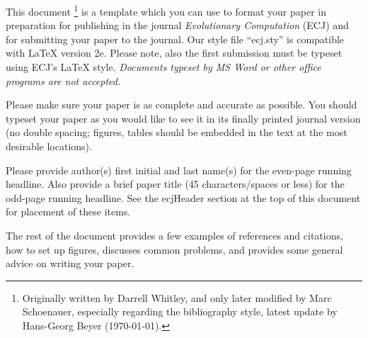 \documentclass[twoside]{article}
\begin{document}
This document%
\footnote{Originally written by Darrell Whitley, and only later
  modified by Marc Schoenauer, especially regarding the bibliography style,
  latest update by Hans-Georg Beyer (\today).} 
is a template which you can use to format your paper in 
preparation for publishing in the journal {\em Evolutionary Computation} 
(ECJ) and for submitting your paper to the journal. Our style file 
``ecj.sty'' is compatible with \LaTeX{} version 2e. Please note, also the 
first submission must be typeset using ECJ's \LaTeX{} style. {\em Documents 
typeset by MS Word or other office programs are not accepted.}   

Please make sure your paper is as complete and accurate as possible. You 
should typeset your paper as you would like to see it 
in its finally printed journal version (no double spacing; figures, tables 
should be embedded in the text at the most desirable locations). 

Please provide author(s) first initial and last name(s) for the even-page 
running headline. Also provide a brief paper title (45 characters/spaces or 
less) for the odd-page running headline.  See the ecjHeader section at the 
top of this document for placement of these items.

The rest of the document provides a few examples of references and 
citations, how to set up figures, discusses common problems, and provides some
general advice on writing your paper.
\end{document}
